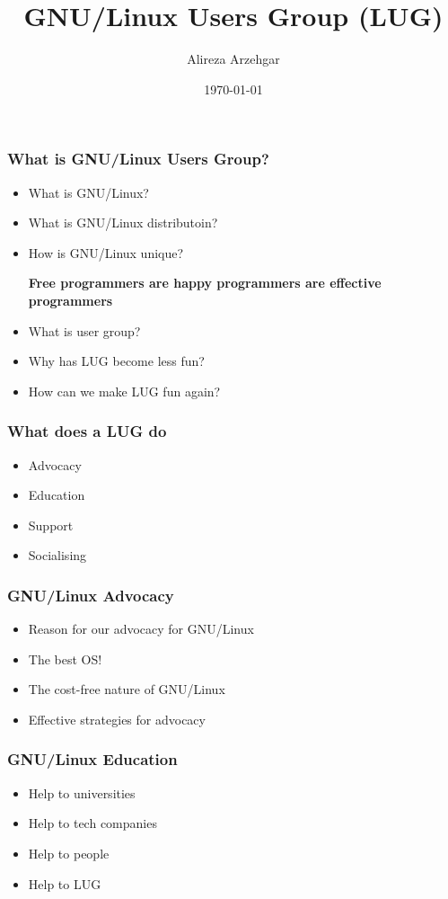 \documentclass{beamer}
\author{Alireza Arzehgar}
\title{GNU/Linux Users Group (LUG)}
\institute{Azad University of Mashhad}
\date{\today}
\begin{document}
	\begin{frame}[plain]
		\maketitle
	\end{frame}

	\begin{frame}
		\frametitle{What is GNU/Linux Users Group?}
		\begin{itemize}
			\pause
			\item What is GNU/Linux?
			\pause
			\item What is GNU/Linux distributoin?
			\pause
			\item How is GNU/Linux unique?

			\pause
			{\bfseries Free programmers are happy programmers are effective programmers}
			\pause
			\item What is user group?
			\pause
			\item Why has LUG become less fun?
			\pause
			\item How can we make LUG fun again?
		\end{itemize}
	\end{frame}

	\begin{frame}
		\frametitle{What does a LUG do}
		\begin{itemize}
			\pause
			\item Advocacy
			\pause
			\item Education
			\pause
			\item Support
			\pause
			\item Socialising
		\end{itemize}
	\end{frame}

	\begin{frame}
		\frametitle{GNU/Linux Advocacy}
		\begin{itemize}
			\pause
			\item Reason for our advocacy for GNU/Linux
			\pause
			\item The best OS!
			\pause
			\item The cost-free nature of GNU/Linux
			\pause
			\item Effective strategies for advocacy
		\end{itemize}
	\end{frame}

	\begin{frame}
		\frametitle{GNU/Linux Education}
		\begin{itemize}
			\pause
			\item Help to universities
			\pause
			\item Help to tech companies
			\pause
			\item Help to people
			\pause
			\item Help to LUG
		\end{itemize}
	\end{frame}
\end{document}
